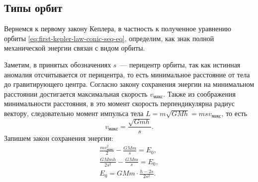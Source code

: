 \subsection{Типы орбит}
\label{sec:orbit-types}

Вернемся к первому закону Кеплера, в частность к полученное уравнению орбиты \eqref{eq:first-kepler-law-conic-seq-eq}, определим, как знак полной механической энергии связан с видом орбиты. 

Заметим, в принятых обозначениях $s$~--- перицентр орбиты, так как истинная аномалия отсчитывается от перицентра, то есть минимальное расстояние от тела до гравитирующего центра. Согласно закону сохранения энергии на минимальном расстоянии достигается максимальная скорость $v_\text{макс}$. Также из соображения минимальности расстояния, в это момент скорость перпендикулярна радиус вектору, следовательно момент импульса тела $L = m\sqrt{GMh} =  m s v_\text{макс}$, то есть
\begin{equation*}
     v_\text{макс} = \frac{\sqrt{Gmh}}{s}.
\end{equation*}
Запишем закон сохранения энергии:
\begin{gather*}
     \frac{m v_\text{макс}^2}{2} - \frac{GMm}{s} = E_0,\\
     \frac{GMmh}{2s^2} - \frac{GMm}{s} = E_0,\\
     E_0 = GMm \cdot \frac{h - 2s}{2s^2}.
\end{gather*}
 

